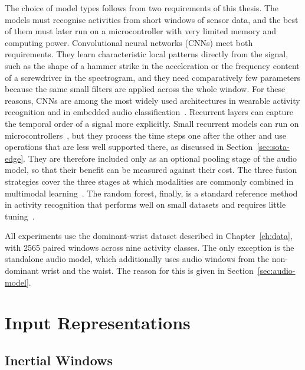 The choice of model types follows from two requirements of this thesis. The
models must recognise activities from short windows of sensor data, and the best
of them must later run on a microcontroller with very limited memory and
computing power. Convolutional neural networks (CNNs) meet both requirements.
They learn characteristic local patterns directly from the signal, such as the
shape of a hammer strike in the acceleration or the frequency content of a
screwdriver in the spectrogram, and they need comparatively few parameters
because the same small filters are applied across the whole window. For these
reasons, CNNs are among the most widely used architectures in wearable activity
recognition and in embedded audio classification~\cite{kumar2024har,
tao2018worker, zhou2025efficient, zhang2017hello}. Recurrent
layers can capture the temporal order of a signal more explicitly. Small
recurrent models can run on microcontrollers~\cite{zhou2025efficient}, but they
process the time steps one after the other and use operations that are less
well supported there, as discussed in Section~\ref{sec:sota-edge}. They are
therefore included only as an optional pooling stage of the audio model, so
that their benefit can be measured against their cost. The three fusion
strategies cover the three stages at which modalities are commonly combined in
multimodal learning~\cite{alamin2019action}. The random forest, finally, is a
standard reference method in activity recognition that performs well on small
datasets and requires little tuning~\cite{chatterjee2020laso,
koch2024recognition}.

All experiments use the dominant-wrist dataset described in
Chapter~\ref{ch:data}, with 2565 paired windows across nine activity classes. The
only exception is the standalone audio model, which additionally uses audio
windows from the non-dominant wrist and the waist. The reason for this is given
in Section~\ref{sec:audio-model}.

\section{Input Representations}
\label{sec:inputs}

\subsection{Inertial Windows}
\label{sec:imu-input}

